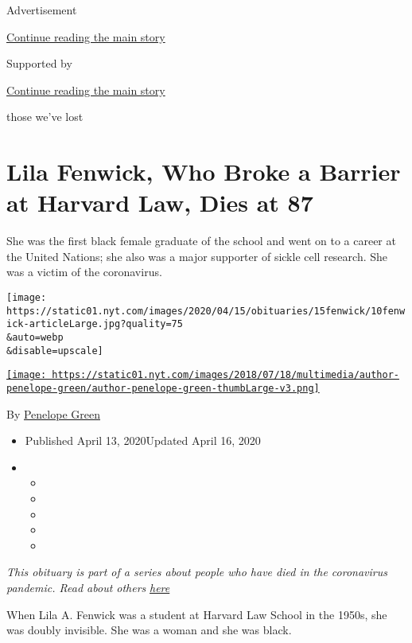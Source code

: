 Advertisement

\protect\hyperlink{after-top}{Continue reading the main story}

Supported by

\protect\hyperlink{after-sponsor}{Continue reading the main story}

those we've lost

\hypertarget{lila-fenwick-who-broke-a-barrier-at-harvard-law-dies-at-87}{%
\section{Lila Fenwick, Who Broke a Barrier at Harvard Law, Dies at
87}\label{lila-fenwick-who-broke-a-barrier-at-harvard-law-dies-at-87}}

She was the first black female graduate of the school and went on to a
career at the United Nations; she also was a major supporter of sickle
cell research. She was a victim of the coronavirus.

\texttt{[image: https://static01.nyt.com/images/2020/04/15/obituaries/15fenwick/10fenwick-articleLarge.jpg?quality=75\\\&auto=webp\\\&disable=upscale]}

\href{https://www.nytimes.com/by/penelope-green}{\texttt{[image: https://static01.nyt.com/images/2018/07/18/multimedia/author-penelope-green/author-penelope-green-thumbLarge-v3.png]}}

By \href{https://www.nytimes.com/by/penelope-green}{Penelope Green}

\begin{itemize}
\item
  Published April 13, 2020Updated April 16, 2020
\item
  \begin{itemize}
  \item
  \item
  \item
  \item
  \item
  \end{itemize}
\end{itemize}

\emph{This obituary is part of a series about people who have died in
the coronavirus pandemic. Read about others}
\href{https://www.nytimes.com/series/people-who-have-died-of-the-coronavirus}{\emph{here}}

When Lila A. Fenwick was a student at Harvard Law School in the 1950s,
she was doubly invisible. She was a woman and she was black.

